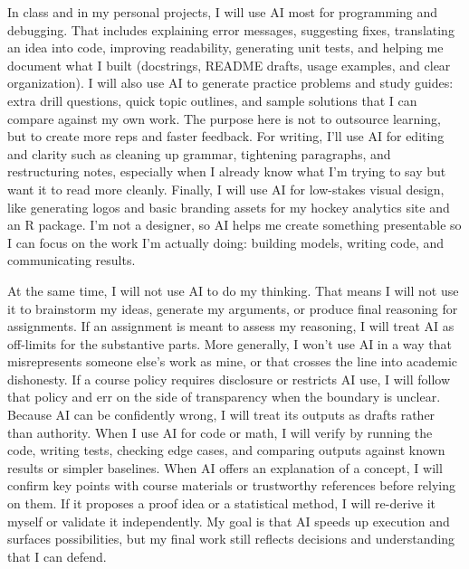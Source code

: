 \documentclass[10pt]{extarticle}
\begin{document}
\medskip

In class and in my personal projects, I will use AI most for programming and debugging. That includes explaining error messages, suggesting fixes, translating an idea into code, improving readability, generating unit tests, and helping me document what I built (docstrings, README drafts, usage examples, and clear organization). I will also use AI to generate practice problems and study guides: extra drill questions, quick topic outlines, and sample solutions that I can compare against my own work. The purpose here is not to outsource learning, but to create more reps and faster feedback. For writing, I’ll use AI for editing and clarity such as cleaning up grammar, tightening paragraphs, and restructuring notes, especially when I already know what I’m trying to say but want it to read more cleanly. Finally, I will use AI for low-stakes visual design, like generating logos and basic branding assets for my hockey analytics site and an R package. I’m not a designer, so AI helps me create something presentable so I can focus on the work I’m actually doing: building models, writing code, and communicating results.

\medskip

At the same time, I will not use AI to do my thinking. That means I will not use it to brainstorm my ideas, generate my arguments, or produce final reasoning for assignments. If an assignment is meant to assess my reasoning, I will treat AI as off-limits for the substantive parts. More generally, I won’t use AI in a way that misrepresents someone else’s work as mine, or that crosses the line into academic dishonesty. If a course policy requires disclosure or restricts AI use, I will follow that policy and err on the side of transparency when the boundary is unclear. Because AI can be confidently wrong, I will treat its outputs as drafts rather than authority. When I use AI for code or math, I will verify by running the code, writing tests, checking edge cases, and comparing outputs against known results or simpler baselines. When AI offers an explanation of a concept, I will confirm key points with course materials or trustworthy references before relying on them. If it proposes a proof idea or a statistical method, I will re-derive it myself or validate it independently. My goal is that AI speeds up execution and surfaces possibilities, but my final work still reflects decisions and understanding that I can defend.

\medskip
\end{document}
